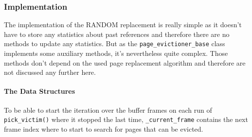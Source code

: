 \subsubsection{Implementation}

	The implementation of the RANDOM replacement is really simple as it doesn't have to store any statistics about past references and therefore there are no methods to update any statistics. But as the \lstinline{page_evictioner_base} class implements some auxiliary methods, it's nevertheless quite complex. Those methods don't depend on the used page replacement algorithm and therefore are not discussed any further here.

\paragraph{The Data Structures}

\begin{@empty}
	\lstset{
		language = [ISO]C++,
		style = basic
	}
	\begin{code}[ht!]
		\caption{Data Structures of the Class \lstinline{page_evictioner_base}} \label{lst:basedef}
		
	\end{code}
\end{@empty}

	To be able to start the iteration over the buffer frames on each run of \lstinline{pick_victim()} where it stopped the last time, \lstinline{_current_frame} contains the next frame index where to start to search for pages that can be evicted.

%		

%		

